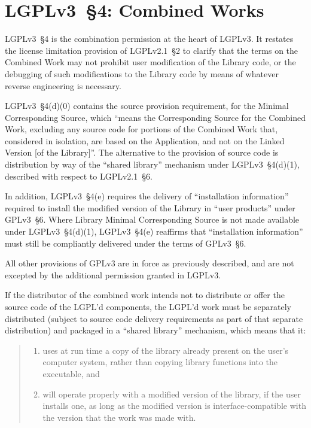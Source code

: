 \section{LGPLv3~\S4: Combined Works}

LGPLv3~\S4 is the combination permission at the heart of LGPLv3. It restates
the license limitation provision of LGPLv2.1~\S2 to clarify that the terms on
the Combined Work may not prohibit user modification of the Library code, or
the debugging of such modifications to the Library code by means of whatever
reverse engineering is necessary.

LGPLv3~\S4(d)(0) contains the source provision requirement, for the Minimal
Corresponding Source, which ``means the Corresponding Source for the Combined
Work, excluding any source code for portions of the Combined Work that,
considered in isolation, are based on the Application, and not on the Linked
Version [of the Library]''. The alternative to the provision of source code is
distribution by way of the ``shared library'' mechanism under LGPLv3~\S4(d)(1),
described with respect to LGPLv2.1~\S6.

In addition, LGPLv3~\S4(e) requires the delivery of ``installation information''
required to install the modified version of the Library in ``user products''
under GPLv3~\S6. Where Library Minimal Corresponding Source is not made
available under LGPLv3~\S4(d)(1), LGPLv3~\S4(e) reaffirms that ``installation information''
must still be compliantly delivered under the terms of GPLv3~\S6.

All other provisions of GPLv3 are in force as previously described, and are
not excepted by the additional permission granted in LGPLv3.

If the distributor of the combined work intends not to distribute or offer
the source code of the LGPL'd components, the LGPL'd work must be separately
distributed (subject to source code delivery requirements as part of that
separate distribution) and packaged in a ``shared library'' mechanism, which
means that it:
\begin{quote}
\begin{enumerate}[label=4(d)(\arabic*):,ref=LGPLv3s4d\arabic*]
  \item uses at run time a copy of the library already present on
    the user's computer system, rather than copying library functions into
    the executable, and

  \item will operate properly with a modified version of
    the library, if the user installs one, as long as the modified version is
    interface-compatible with the version that the work was made with.
\end{enumerate}
\end{quote}


